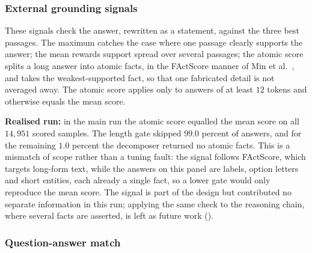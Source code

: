 \subsubsection{External grounding signals}
\label{sec:verifier-grounding}

These signals check the answer, rewritten as a statement, against the three best passages. The maximum catches the case where one passage clearly supports the answer; the mean rewards support spread over several passages; the atomic score splits a long answer into atomic facts, in the FActScore manner of Min et al.~\cite{min-etal-2023-factscore}, and takes the weakest-supported fact, so that one fabricated detail is not averaged away. The atomic score applies only to answers of at least $12$ tokens and otherwise equals the mean score.

\textbf{Realised run:} in the main run the atomic score equalled the mean score on all $14{,}951$ scored samples. The length gate skipped $99.0$ percent of answers, and for the remaining $1.0$ percent the decomposer returned no atomic facts. This is a mismatch of scope rather than a tuning fault: the signal follows FActScore, which targets long-form text, while the answers on this panel are labels, option letters and short entities, each already a single fact, so a lower gate would only reproduce the mean score. The signal is part of the design but contributed no separate information in this run; applying the same check to the reasoning chain, where several facts are asserted, is left as future work ().

\subsubsection{Question-answer match}
\label{sec:verifier-qa-rel}

